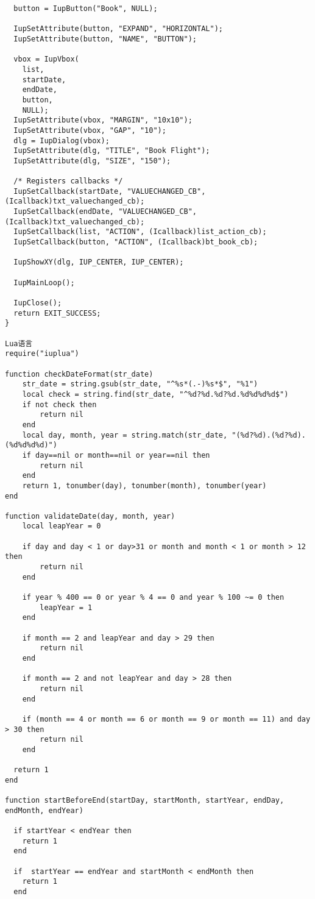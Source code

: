 \documentclass{ctexart}
\begin{document}
\begin{lstlisting}
  button = IupButton("Book", NULL);

  IupSetAttribute(button, "EXPAND", "HORIZONTAL");
  IupSetAttribute(button, "NAME", "BUTTON");

  vbox = IupVbox(
    list,
    startDate,
    endDate,
    button,
    NULL);
  IupSetAttribute(vbox, "MARGIN", "10x10");
  IupSetAttribute(vbox, "GAP", "10");
  dlg = IupDialog(vbox);
  IupSetAttribute(dlg, "TITLE", "Book Flight");
  IupSetAttribute(dlg, "SIZE", "150");

  /* Registers callbacks */
  IupSetCallback(startDate, "VALUECHANGED_CB", (Icallback)txt_valuechanged_cb);
  IupSetCallback(endDate, "VALUECHANGED_CB", (Icallback)txt_valuechanged_cb);
  IupSetCallback(list, "ACTION", (Icallback)list_action_cb);
  IupSetCallback(button, "ACTION", (Icallback)bt_book_cb);

  IupShowXY(dlg, IUP_CENTER, IUP_CENTER);

  IupMainLoop();

  IupClose();
  return EXIT_SUCCESS;
}

Lua语言
require("iuplua")

function checkDateFormat(str_date)
	str_date = string.gsub(str_date, "^%s*(.-)%s*$", "%1")
	local check = string.find(str_date, "^%d?%d.%d?%d.%d%d%d%d$")
	if not check then
		return nil
	end
	local day, month, year = string.match(str_date, "(%d?%d).(%d?%d).(%d%d%d%d)")
	if day==nil or month==nil or year==nil then
		return nil
	end
	return 1, tonumber(day), tonumber(month), tonumber(year)
end

function validateDate(day, month, year)
	local leapYear = 0

	if day and day < 1 or day>31 or month and month < 1 or month > 12 then
		return nil
	end

	if year % 400 == 0 or year % 4 == 0 and year % 100 ~= 0 then
		leapYear = 1
	end

	if month == 2 and leapYear and day > 29 then
		return nil
	end

	if month == 2 and not leapYear and day > 28 then
		return nil
	end

	if (month == 4 or month == 6 or month == 9 or month == 11) and day > 30 then
		return nil
	end

  return 1
end

function startBeforeEnd(startDay, startMonth, startYear, endDay, endMonth, endYear)

  if startYear < endYear then
    return 1
  end

  if  startYear == endYear and startMonth < endMonth then
    return 1
  end


\end{lstlisting}
\end{document}
